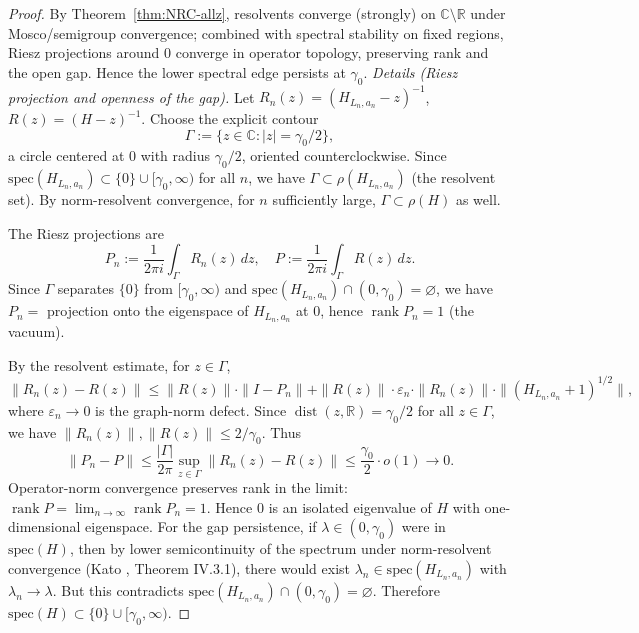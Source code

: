 \documentclass[11pt]{amsart}
\theoremstyle{plain}
\theoremstyle{definition}
\theoremstyle{remark}
\begin{document}
\begin{proof}
By Theorem~\ref{thm:NRC-allz}, resolvents converge (strongly) on $\mathbb C\setminus\mathbb R$ under Mosco/semigroup convergence; combined with spectral stability on fixed regions, Riesz projections around $0$ converge in operator topology, preserving rank and the open gap. Hence the lower spectral edge persists at $\gamma_0$.
\smallskip
\noindent\emph{Details (Riesz projection and openness of the gap).} Let $R_n(z)=(H_{L_n,a_n}-z)^{-1}$, $R(z)=(H-z)^{-1}$. Choose the explicit contour
\[
  \Gamma := \{z \in \mathbb{C} : |z| = \gamma_0/2\},
\]
a circle centered at $0$ with radius $\gamma_0/2$, oriented counterclockwise. Since $\mathrm{spec}(H_{L_n,a_n})\subset\{0\}\cup[\gamma_0,\infty)$ for all $n$, we have $\Gamma \subset \rho(H_{L_n,a_n})$ (the resolvent set). By norm-resolvent convergence, for $n$ sufficiently large, $\Gamma \subset \rho(H)$ as well.

The Riesz projections are
\[
  P_n := \frac{1}{2\pi i}\int_\Gamma R_n(z)\,dz, \quad P := \frac{1}{2\pi i}\int_\Gamma R(z)\,dz.
\]
Since $\Gamma$ separates $\{0\}$ from $[\gamma_0,\infty)$ and $\mathrm{spec}(H_{L_n,a_n})\cap(0,\gamma_0)=\varnothing$, we have $P_n = $ projection onto the eigenspace of $H_{L_n,a_n}$ at $0$, hence $\operatorname{rank} P_n = 1$ (the vacuum).

By the resolvent estimate, for $z \in \Gamma$,
\[
  \|R_n(z) - R(z)\| \le \|R(z)\| \cdot \|I - P_n\| + \|R(z)\| \cdot \varepsilon_n \cdot \|R_n(z)\| \cdot \|(H_{L_n,a_n}+1)^{1/2}\|,
\]
where $\varepsilon_n \to 0$ is the graph-norm defect. Since $\operatorname{dist}(z,\mathbb{R}) = \gamma_0/2$ for all $z \in \Gamma$, we have $\|R_n(z)\|, \|R(z)\| \le 2/\gamma_0$. Thus
\[
  \|P_n - P\| \le \frac{|\Gamma|}{2\pi} \sup_{z \in \Gamma} \|R_n(z) - R(z)\| \le \frac{\gamma_0}{2} \cdot o(1) \to 0.
\]
Operator-norm convergence preserves rank in the limit: $\operatorname{rank} P = \lim_{n\to\infty} \operatorname{rank} P_n = 1$. Hence $0$ is an isolated eigenvalue of $H$ with one-dimensional eigenspace.
For the gap persistence, if $\lambda \in (0,\gamma_0)$ were in $\mathrm{spec}(H)$, then by lower semicontinuity of the spectrum under norm-resolvent convergence (Kato \cite{Kato1995}, Theorem IV.3.1), there would exist $\lambda_n \in \mathrm{spec}(H_{L_n,a_n})$ with $\lambda_n \to \lambda$. But this contradicts $\mathrm{spec}(H_{L_n,a_n}) \cap (0,\gamma_0) = \varnothing$. Therefore $\mathrm{spec}(H) \subset \{0\} \cup [\gamma_0,\infty)$.
\end{proof}
\end{document}

